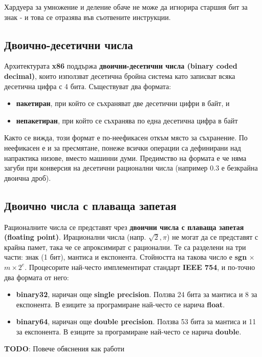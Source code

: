 \documentclass[fleqn,12pt]{article}
\begin{document}
Хардуера за умножение и деление обаче не може да игнорира старшия бит за знак - и това се отразява във съотвените инструкции.

\subsection{Двоично-десетични числа}
Архитектурата \textbf{x86} поддържа \textbf{двоични-десетични числа (binary coded decimal)}, които използват десетична бройна система като
записват всяка десетична цифра с 4 бита. Съществуват два формата:
\begin{itemize}
    \item \textbf{пакетиран}, при който се съхраняват две десетични цифри в байт, и
    \item \textbf{непакетиран}, при който се съхранява по една десетична цифра в байт
\end{itemize}
Както се вижда, този формат е по-неефикасен откъм място за съхранение. По неефикасен е и за пресмятане, понеже всички операции са 
дефинирани над напрактика низове, вместо машинни думи. Предимство на формата е че няма загуби при конверсия на десетични рационални числа
(например $0.3$ е безкрайна двоична дроб).

\subsection{Двоично числа с плаваща запетая}
Рационалните числа се представят чрез \textbf{двоични числа с плаваща запетая (floating point)}.
Ирационални числа (напр. $\sqrt{2}, \pi$) не могат да се представят с крайна памет, така че се апроксимират с рационални.
Те са разделени на три части: знак (1 бит), мантиса и експонента. Стойността на такова число е \textbf{sgn} $ \times $ $ m \times 2^e$.
Процесорите най-често имплементират стандарт \textbf{IEEE 754}, и по-точно два формата от него:
\begin{itemize}
    \item \textbf{binary32}, наричан още \textbf{single precision}. Ползва 24 бита за мантиса и 8 за експонента. В езиците за програмиране най-често се нарича \textbf{float}.
    \item \textbf{binary64}, наричан още \textbf{double precision}. Ползва 53 бита за мантиса и 11 за експонента. В езиците за програмиране най-често се нарича \textbf{double}.
\end{itemize}

\textbf{TODO}: Повече обяснения как работи
\end{document}
